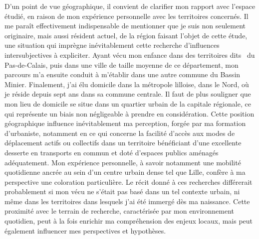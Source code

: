 \begin{refsegment}
D'un point de vue géographique, il convient de clarifier mon rapport avec l'espace étudié, en raison de mon expérience personnelle avec les territoires concernés. Il me paraît effectivement indispensable de mentionner que je suis non seulement originaire, mais aussi résident actuel, de la région faisant l'objet de cette étude, une situation qui imprègne inévitablement cette recherche d'influences intersubjectives à expliciter. Ayant vécu mon enfance dans des territoires dits ~du Pas-de-Calais, puis dans une ville de taille moyenne de ce département, mon parcours m'a ensuite conduit à m'établir dans une autre commune du Bassin Minier. Finalement, j'ai élu domicile dans la métropole lilloise, dans le Nord, où je réside depuis sept ans dans sa commune centrale. Il faut de plus souligner que mon lieu de domicile se situe dans un quartier urbain de la capitale régionale, ce qui représente un biais non négligeable à prendre en considération. Cette position géographique influence inévitablement ma perception, forgée par ma formation d'urbaniste, notamment en ce qui concerne la facilité d'accès aux modes de déplacement actifs ou collectifs dans un territoire bénéficiant d'une excellente desserte en transports en commun et doté d'espaces publics aménagés adéquatement. Mon expérience personnelle, à savoir notamment une mobilité quotidienne ancrée au sein d'un centre urbain dense tel que Lille, confère à ma perspective une coloration particulière. Le récit donné à ces recherches différerait probablement si mon vécu ne s'était pas basé dans un tel contexte urbain, ni même dans les territoires dans lesquels j'ai été immergé dès ma naissance. Cette proximité avec le terrain de recherche, caractérisée par mon environnement quotidien, peut à la fois enrichir ma compréhension des enjeux locaux, mais peut également influencer mes perspectives et hypothèses.%


\end{refsegment}
